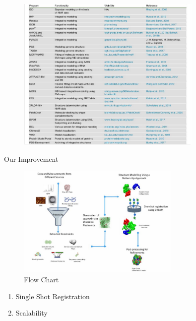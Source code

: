 \begin{frame}

    \begin{figure}
        \centering
        \includegraphics[width=0.8\textwidth]{images/table.png}
        \caption{}
        \label{fig:my_label}
    \end{figure}
    
\end{frame}

\begin{frame}{Our Improvement}
    \begin{figure}
        \centering
        \includegraphics[width=0.7\textwidth]{images/dream.png}
        \caption{Flow Chart}
        \label{fig:my_label}
    \end{figure}

    \begin{enumerate}
        \item Single Shot Registration
        \item Scalability
    \end{enumerate}
\end{frame}
